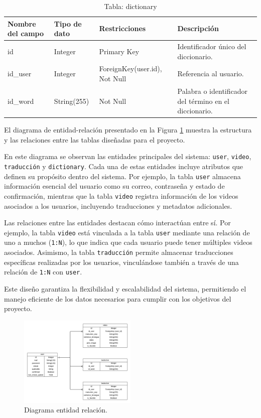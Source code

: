 \begin{table}[H]
\centering
\begin{tabularx}{\textwidth}{|l|l|l|X|}
\hline
\textbf{Nombre del campo} & \textbf{Tipo de dato} & \textbf{Restricciones} & \textbf{Descripción} \\ \hline
id                       & Integer               & Primary Key            & Identificador único del diccionario. \\ \hline
id\_user                 & Integer               & ForeignKey(user.id), Not Null & Referencia al usuario. \\ \hline
id\_word                 & String(255)           & Not Null                & Palabra o identificador del término en el diccionario. \\ \hline
\end{tabularx}
\caption{Tabla: dictionary}
\end{table}

El diagrama de entidad-relación presentado en la Figura \ref{fig:entidad_relacion} muestra la estructura y las relaciones entre las tablas diseñadas para el proyecto. 

En este diagrama se observan las entidades principales del sistema: \texttt{user}, \texttt{video}, \texttt{traducción} y \texttt{dictionary}. Cada una de estas entidades incluye atributos que definen su propósito dentro del sistema. Por ejemplo, la tabla \texttt{user} almacena información esencial del usuario como su correo, contraseña y estado de confirmación, mientras que la tabla \texttt{video} registra información de los videos asociados a los usuarios, incluyendo traducciones y metadatos adicionales.

Las relaciones entre las entidades destacan cómo interactúan entre sí. Por ejemplo, la tabla \texttt{video} está vinculada a la tabla \texttt{user} mediante una relación de uno a muchos (\texttt{1:N}), lo que indica que cada usuario puede tener múltiples videos asociados. Asimismo, la tabla \texttt{traducción} permite almacenar traducciones específicas realizadas por los usuarios, vinculándose también a través de una relación de \texttt{1:N} con \texttt{user}.

Este diseño garantiza la flexibilidad y escalabilidad del sistema, permitiendo el manejo eficiente de los datos necesarios para cumplir con los objetivos del proyecto.

\begin{figure}[H]
    \centering
    \includegraphics[width=0.5\textwidth]{figuras/entidad_relacion.png}
    \caption{Diagrama entidad relación.}
    \label{fig:entidad_relacion}
\end{figure}

